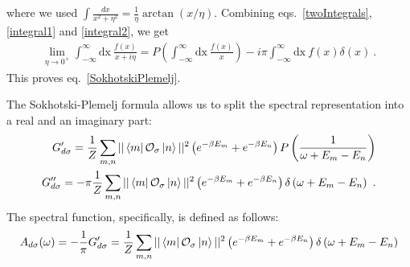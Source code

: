 where we used \(\int \frac{dx}{x^2 + \eta^2} = \frac{1}{\eta} \arctan\left( x/\eta \right) \). Combining eqs.~\ref{twoIntegrals},\ref{integral1} and \ref{integral2}, we get
\begin{equation}\begin{aligned}
	\lim_{\eta \to 0^+}\int_{-\infty}^{\infty} \text{dx}~\frac{f(x)}{x + i \eta} = P\left(\int_{-\infty}^{\infty} \text{dx}~\frac{f(x)}{x}\right) - i\pi \int_{-\infty}^{\infty} \text{dx}~f(x)\delta(x)~.
\end{aligned}\end{equation}
This proves eq.~\ref{SokhotskiPlemelj}.

The Sokhotski-Plemelj formula allows us to split the spectral representation into a real and an imaginary part:
\begin{equation}\begin{aligned}
	G_{d\sigma}^\prime = \frac{1}{Z}\sum_{m,n}||\bra{m}\mathcal{O}_{\sigma}\ket{n}||^2\left( e^{-\beta E_m} + e^{-\beta E_n}\right)P\left(\frac{1}{\omega + E_m - E_n}\right)\\
	G_{d\sigma}^{\prime\prime} = -\pi\frac{1}{Z}\sum_{m,n}||\bra{m}\mathcal{O}_{\sigma}\ket{n}||^2\left( e^{-\beta E_m} + e^{-\beta E_n}\right)\delta\left(\omega + E_m - E_n\right)~.
\end{aligned}\end{equation}
The spectral function, specifically, is defined as follows:
\begin{equation}\begin{aligned}
	A_{d\sigma}(\omega) = -\frac{1}{\pi}G_{d\sigma}^\prime = \frac{1}{Z}\sum_{m,n}||\bra{m}\mathcal{O}_{\sigma}\ket{n}||^2\left( e^{-\beta E_m} + e^{-\beta E_n}\right)\delta\left(\omega + E_m - E_n\right)
\end{aligned}\end{equation}

